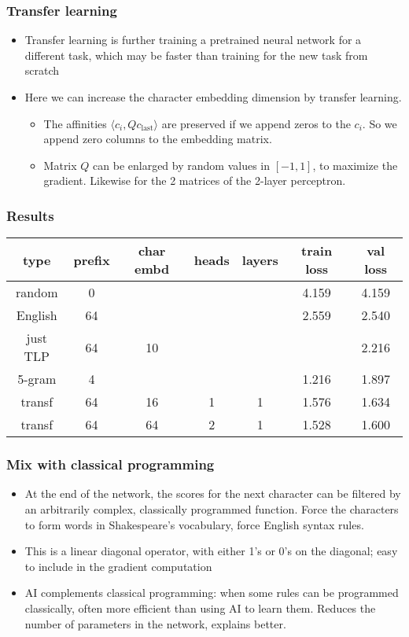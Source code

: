 \documentclass{beamer}
\begin{document}
\begin{frame}
\frametitle{Transfer learning}
\begin{itemize}
\item Transfer learning is further training a pretrained neural network for a different task, which may be faster than training for the new task from scratch
\bigskip
\item Here we can increase the character embedding dimension by transfer learning. 

\begin{itemize}
\item The affinities $\langle c_i, Q c_{\text{last}} \rangle$ are preserved if we append zeros to the $c_i$. So we append zero columns to the embedding matrix.
\item Matrix $Q$ can be enlarged by random values in $[-1,1]$, to maximize the gradient. Likewise for the 2 matrices of the 2-layer perceptron.
\end{itemize}
\end{itemize}
\end{frame}

\begin{frame}
\frametitle{Results}
\begin{tabular}{ccccccc} type & prefix & char embd & heads & layers & train loss & val loss \\
\hline
random & 0 & & & & 4.159 & 4.159 \\
English & 64 & & & & 2.559 & 2.540 \\
just TLP & 64 & 10 & & & & 2.216 \\
5-gram & 4 & & & & 1.216 & 1.897 \\
transf & 64 & 16 & 1 & 1 & 1.576 & 1.634 \\
transf & 64 & 64 & 2 & 1 & 1.528 & 1.600
\end{tabular}

\end{frame}

\begin{frame}
\frametitle{Mix with classical programming}
\begin{itemize}
\item At the end of the network, the scores for the next character can be filtered by an arbitrarily complex, classically programmed function. Force the characters to form words in Shakespeare's vocabulary, force English syntax rules.
\bigskip
\item This is a linear diagonal operator, with either 1's or 0's on the diagonal; easy to include in the gradient computation
\bigskip
\item AI complements classical programming: when some rules can be programmed classically, often more efficient than using AI to learn them. Reduces the number of parameters in the network, explains better.
\end{itemize}
\end{frame}
\end{document}

